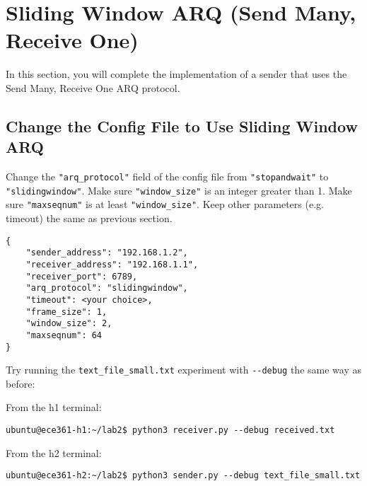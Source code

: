 \documentclass[11pt]{article}
\begin{document}
\section{Sliding Window ARQ (Send Many, Receive One)}
\label{sec:sliding}
In this section, you will complete the implementation of a sender that uses the Send Many, Receive One ARQ protocol.

\subsection{Change the Config File to Use Sliding Window ARQ}
Change the \texttt{"arq\_protocol"} field of the config file from \texttt{"stopandwait"} to \texttt{"slidingwindow"}.
Make sure \texttt{"window\_size"} is an integer greater than 1.
Make sure \texttt{"maxseqnum"} is at least \texttt{"window\_size"}.
Keep other parameters (e.g. timeout) the same as previous section.
\begin{lstlisting}[style=ece361-shell-base, caption={Sliding Window Configuration}]
{
    "sender_address": "192.168.1.2",
    "receiver_address": "192.168.1.1",
    "receiver_port": 6789,
    "arq_protocol": "slidingwindow",
    "timeout": <your choice>,
    "frame_size": 1,
    "window_size": 2,
    "maxseqnum": 64
}
\end{lstlisting}


Try running the \texttt{text\_file\_small.txt} experiment with \texttt{-{}-debug} the same way as before:

\noindent From the h1 terminal:
\begin{lstlisting}[style=ece361-shell-base, caption={}]
ubuntu@ece361-h1:~/lab2$ python3 receiver.py --debug received.txt
\end{lstlisting}

From the h2 terminal:
\begin{lstlisting}[style=ece361-shell-base, caption={}]
ubuntu@ece361-h2:~/lab2$ python3 sender.py --debug text_file_small.txt
\end{lstlisting}
\end{document}

